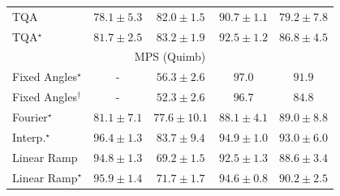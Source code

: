 \begin{tabular}{l|cccc|}
TQA & {\cellcolor[HTML]{8C7DBA}} \color[HTML]{F1F1F1} $78.1\pm 5.3$ & {\cellcolor[HTML]{8B60AC}} \color[HTML]{F1F1F1} $82.0\pm 1.5$ & {\cellcolor[HTML]{821982}} \color[HTML]{F1F1F1} $90.7\pm 1.1$ & {\cellcolor[HTML]{8C75B6}} \color[HTML]{F1F1F1} $79.2\pm 7.8$ \\
TQA$^\star$ & {\cellcolor[HTML]{8B62AD}} \color[HTML]{F1F1F1} $81.7\pm 2.5$ & {\cellcolor[HTML]{8A56A7}} \color[HTML]{F1F1F1} $83.2\pm 1.9$ & {\cellcolor[HTML]{790D75}} \color[HTML]{F1F1F1} $92.5\pm 1.2$ & {\cellcolor[HTML]{873B99}} \color[HTML]{F1F1F1} $86.8\pm 4.5$ \\
\cline{1-5}
\multicolumn{5}{c}{\rule{0pt}{8pt}MPS (Quimb)} \\
\midrule
Fixed Angles$^\star$ & {\cellcolor[HTML]{000000}} \color[HTML]{F1F1F1} {\cellcolor{white}} \color{black} - & {\cellcolor[HTML]{FFF9C9}} \color[HTML]{000000} $56.3\pm 2.6$ & {\cellcolor[HTML]{692606}} \color[HTML]{F1F1F1} $97.0$ & {\cellcolor[HTML]{983404}} \color[HTML]{F1F1F1} $91.9$ \\
Fixed Angles$^\dagger$ & {\cellcolor[HTML]{000000}} \color[HTML]{F1F1F1} {\cellcolor{white}} \color{black} - & {\cellcolor[HTML]{FFFFE5}} \color[HTML]{000000} $52.3\pm 2.6$ & {\cellcolor[HTML]{6B2606}} \color[HTML]{F1F1F1} $96.7$ & {\cellcolor[HTML]{D35406}} \color[HTML]{F1F1F1} $84.8$ \\
Fourier$^\star$ & {\cellcolor[HTML]{E86C12}} \color[HTML]{F1F1F1} $81.1\pm 7.1$ & {\cellcolor[HTML]{F5851F}} \color[HTML]{F1F1F1} $77.6\pm 10.1$ & {\cellcolor[HTML]{B94303}} \color[HTML]{F1F1F1} $88.1\pm 4.1$ & {\cellcolor[HTML]{B13F03}} \color[HTML]{F1F1F1} $89.0\pm 8.8$ \\
Interp.$^\star$ & {\cellcolor[HTML]{6E2706}} \color[HTML]{F1F1F1} $96.4\pm 1.3$ & {\cellcolor[HTML]{D95B09}} \color[HTML]{F1F1F1} $83.7\pm 9.4$ & {\cellcolor[HTML]{7C2C05}} \color[HTML]{F1F1F1} $94.9\pm 1.0$ & {\cellcolor[HTML]{8C3004}} \color[HTML]{F1F1F1} $93.0\pm 6.0$ \\
Linear Ramp & {\cellcolor[HTML]{7C2C05}} \color[HTML]{F1F1F1} $94.8\pm 1.3$ & {\cellcolor[HTML]{FEC550}} \color[HTML]{000000} $69.2\pm 1.5$ & {\cellcolor[HTML]{913204}} \color[HTML]{F1F1F1} $92.5\pm 1.3$ & {\cellcolor[HTML]{B44103}} \color[HTML]{F1F1F1} $88.6\pm 3.4$ \\
Linear Ramp$^\star$ & {\cellcolor[HTML]{732905}} \color[HTML]{F1F1F1} $95.9\pm 1.4$ & {\cellcolor[HTML]{FEB13E}} \color[HTML]{000000} $71.7\pm 1.7$ & {\cellcolor[HTML]{7E2C05}} \color[HTML]{F1F1F1} $94.6\pm 0.8$ & {\cellcolor[HTML]{A63A03}} \color[HTML]{F1F1F1} $90.2\pm 2.5$ \\

\end{tabular}
